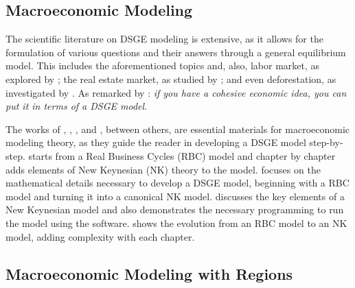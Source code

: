 \documentclass[../thesis.tex]{subfiles}
\begin{document}
	\subsection*{Macroeconomic Modeling}
	
	The scientific literature on DSGE modeling is extensive, as it allows for the formulation of various questions and their answers through a general equilibrium model. This includes the aforementioned topics and, also, labor market, as explored by \textcite{ribeiro_alongamento_2023}; the real estate market, as studied by \textcite{albuquerquemello_mercado_2018}; and even deforestation, as investigated by \textcite{pereira_desmatamento_2013}. As remarked by \textcite{solis-garcia_ucb_2022}: \textit{if you have a cohesive economic idea, you can put it in terms of a DSGE model}. %
	
	The works of \textcite{costa_junior_understanding_2016}, \textcite{solis-garcia_ucb_2022}, \textcite{bergholt_basic_2012}, and \textcite{gali_monetary_2015}, between others, are essential materials for macroeconomic modeling theory, as they guide the reader in developing a DSGE model step-by-step. \textcite{costa_junior_understanding_2016} starts from a Real Business Cycles (RBC) model and chapter by chapter adds elements of New Keynesian (NK) theory to the model. \textcite{solis-garcia_ucb_2022} focuses on the mathematical details necessary to develop a DSGE model, beginning with a RBC model and turning it into a canonical NK model. \textcite{bergholt_basic_2012} discusses the key elements of a New Keynesian model and also demonstrates the necessary programming to run the model using the \dynare{} software. \textcite{gali_monetary_2015} shows the evolution from an RBC model to an NK model, adding complexity with each chapter.
	
	
	\subsection*{Macroeconomic Modeling with Regions}

	
\end{document}
